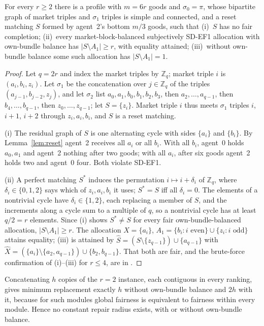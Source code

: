 \documentclass[sigconf,anonymous]{aamas}
\begin{document}
\begin{theorem}\label{thm:distance}
For every $r\ge2$ there is a profile with $m=6r$ goods and $\sigma_0=\pi$, whose bipartite graph of market triples and $\sigma_1$ triples is simple and connected, and a reset matching $S$ formed by agent~2's bottom $m/3$ goods, such that (i)~$S$ has no fair completion; (ii)~every market-block-balanced subjectively SD-EF1 allocation with own-bundle balance has $|S\setminus A_1|\ge r$, with equality attained; (iii)~without own-bundle balance some such allocation has $|S\setminus A_1|=1$.
\end{theorem}
\begin{proof}
Let $q=2r$ and index the market triples by $\mathbb Z_q$; market triple $i$ is $(a_i,b_i,z_i)$. Let $\sigma_1$ be the concatenation over $j\in\mathbb Z_q$ of the triples $(a_{j-1},b_{j-2},z_j)$, and let $\sigma_2$ list $a_0,a_1,b_0,b_1,b_2,b_3$, then $a_2,\dots,a_{q-1}$, then $b_4,\dots,b_{q-1}$, then $z_0,\dots,z_{q-1}$; let $S=\{z_i\}$. Market triple $i$ thus meets $\sigma_1$ triples $i$, $i+1$, $i+2$ through $z_i,a_i,b_i$, and $S$ is a reset matching.

(i) The residual graph of $S$ is one alternating cycle with sides $\{a_i\}$ and $\{b_i\}$. By Lemma~\ref{lem:reset} agent~2 receives all $a_i$ or all $b_i$. With all $b_i$, agent~0 holds $a_0,a_1$ and agent~2 nothing after two goods; with all $a_i$, after six goods agent~2 holds two and agent~0 four. Both violate SD-EF1.

(ii) A perfect matching $S^*$ induces the permutation $i\mapsto i+\delta_i$ of $\mathbb Z_q$, where $\delta_i\in\{0,1,2\}$ says which of $z_i,a_i,b_i$ it uses; $S^*=S$ iff all $\delta_i=0$. The elements of a nontrivial cycle have $\delta_i\in\{1,2\}$, each replacing a member of $S$, and the increments along a cycle sum to a multiple of $q$, so a nontrivial cycle has at least $q/2=r$ elements. Since (i) shows $S^*\ne S$ for every fair own-bundle-balanced allocation, $|S\setminus A_1|\ge r$. The allocation $X=\{a_i\}$, $A_1=\{b_i:i\text{ even}\}\cup\{z_i:i\text{ odd}\}$ attains equality; (iii) is attained by $\widehat S=(S\setminus\{z_{q-1}\})\cup\{a_{q-1}\}$ with $\widehat X=(\{a_i\}\setminus\{a_2,a_{q-1}\})\cup\{b_2,b_{q-1}\}$. That both are fair, and the brute-force confirmation of (i)--(iii) for $r\le4$, are in \appDistance.
\end{proof}
Concatenating $h$ copies of the $r=2$ instance, each contiguous in every ranking, gives minimum replacement exactly $h$ without own-bundle balance and $2h$ with it, because for such modules global fairness is equivalent to fairness within every module. Hence no constant repair radius exists, with or without own-bundle balance.
\end{document}
